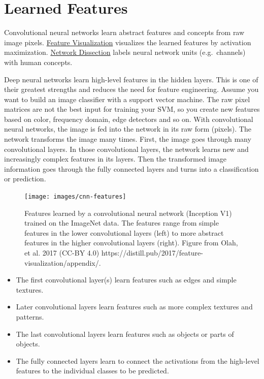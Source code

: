 \documentclass[12pt,]{krantz}
\providecommand{\tightlist}{%
  \setlength{\itemsep}{0pt}\setlength{\parskip}{0pt}}
\begin{document}
\newpage 

\hypertarget{cnn-features}{\section{Learned
Features}\label{cnn-features}}

Convolutional neural networks learn abstract features and concepts from
raw image pixels. \protect\hyperlink{feature-visualization}{Feature
Visualization} visualizes the learned features by activation
maximization. \protect\hyperlink{network-dissection}{Network Dissection}
labels neural network units (e.g.~channels) with human concepts.

Deep neural networks learn high-level features in the hidden layers.
This is one of their greatest strengths and reduces the need for feature
engineering. Assume you want to build an image classifier with a support
vector machine. The raw pixel matrices are not the best input for
training your SVM, so you create new features based on color, frequency
domain, edge detectors and so on. With convolutional neural networks,
the image is fed into the network in its raw form (pixels). The network
transforms the image many times. First, the image goes through many
convolutional layers. In those convolutional layers, the network learns
new and increasingly complex features in its layers. Then the
transformed image information goes through the fully connected layers
and turns into a classification or prediction.

\begin{figure}

{\centering \texttt{[image: images/cnn-features]} 

}

\caption{Features learned by a convolutional neural network (Inception V1) trained on the ImageNet data. The features range from simple features in the lower convolutional layers (left) to more abstract features in the higher convolutional layers (right). Figure from Olah, et al. 2017 (CC-BY 4.0) https://distill.pub/2017/feature-visualization/appendix/.}\label{fig:unnamed-chunk-53}
\end{figure}

\begin{itemize}
\tightlist
\item
  The first convolutional layer(s) learn features such as edges and
  simple textures.
\item
  Later convolutional layers learn features such as more complex
  textures and patterns.
\item
  The last convolutional layers learn features such as objects or parts
  of objects.
\item
  The fully connected layers learn to connect the activations from the
  high-level features to the individual classes to be predicted.
\end{itemize}
\end{document}
